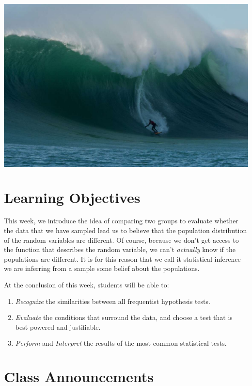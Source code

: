 \documentclass[
]{book}
\providecommand{\tightlist}{%
  \setlength{\itemsep}{0pt}\setlength{\parskip}{0pt}}
\theoremstyle{definition}
\theoremstyle{definition}
\theoremstyle{definition}
\theoremstyle{definition}
\theoremstyle{remark}
\begin{document}
\includegraphics{./images/goin_left.jpeg}

\hypertarget{learning-objectives-6}{%
\section{Learning Objectives}\label{learning-objectives-6}}

This week, we introduce the idea of comparing two groups to evaluate whether the data that we have sampled lead us to believe that the population distribution of the random variables are different. Of course, because we don't get access to the function that describes the random variable, we can't \emph{actually} know if the populations are different. It is for this reason that we call it statistical inference -- we are inferring from a sample some belief about the populations.

At the conclusion of this week, students will be able to:

\begin{enumerate}
\def\labelenumi{\arabic{enumi}.}
\tightlist
\item
  \emph{Recognize} the similarities between all frequentist hypothesis tests.
\item
  \emph{Evaluate} the conditions that surround the data, and choose a test that is best-powered and justifiable.
\item
  \emph{Perform} and \emph{Interpret} the results of the most common statistical tests.
\end{enumerate}

\hypertarget{class-announcements-5}{%
\section{Class Announcements}\label{class-announcements-5}}
\end{document}
